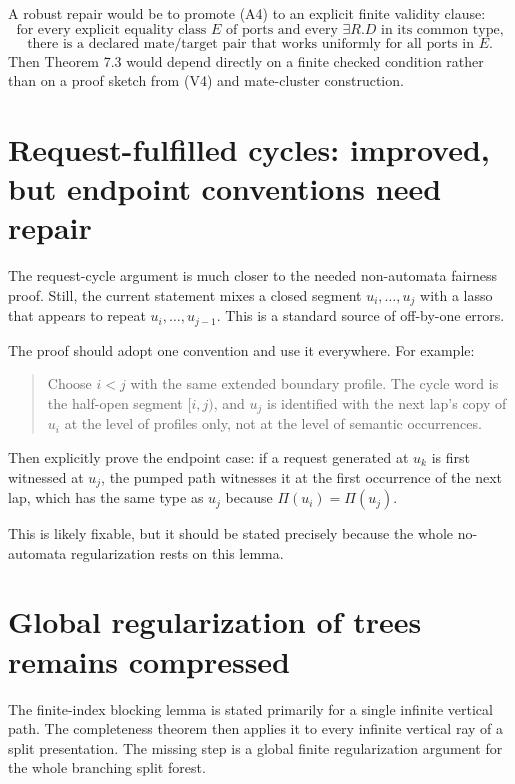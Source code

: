 \documentclass[11pt]{article}
\begin{document}
A robust repair would be to promote (A4) to an explicit finite validity clause:
\[
\text{for every explicit equality class }E\text{ of ports and every }\exists R.D\text{ in its common type,}
\]
\[
\text{there is a declared mate/target pair that works uniformly for all ports in }E.
\]
Then Theorem 7.3 would depend directly on a finite checked condition rather than on a proof sketch from (V4) and mate-cluster construction.

\section{Request-fulfilled cycles: improved, but endpoint conventions need repair}

The request-cycle argument is much closer to the needed non-automata fairness proof.  Still, the current statement mixes a closed segment $u_i,\ldots,u_j$ with a lasso that appears to repeat $u_i,\ldots,u_{j-1}$.  This is a standard source of off-by-one errors.

The proof should adopt one convention and use it everywhere.  For example:
\begin{quote}
Choose $i<j$ with the same extended boundary profile.  The cycle word is the half-open segment $[i,j)$, and $u_j$ is identified with the next lap's copy of $u_i$ at the level of profiles only, not at the level of semantic occurrences.
\end{quote}
Then explicitly prove the endpoint case: if a request generated at $u_k$ is first witnessed at $u_j$, the pumped path witnesses it at the first occurrence of the next lap, which has the same type as $u_j$ because $\Pi(u_i)=\Pi(u_j)$.

This is likely fixable, but it should be stated precisely because the whole no-automata regularization rests on this lemma.

\section{Global regularization of trees remains compressed}

The finite-index blocking lemma is stated primarily for a single infinite vertical path.  The completeness theorem then applies it to every infinite vertical ray of a split presentation.  The missing step is a global finite regularization argument for the whole branching split forest.
\end{document}
